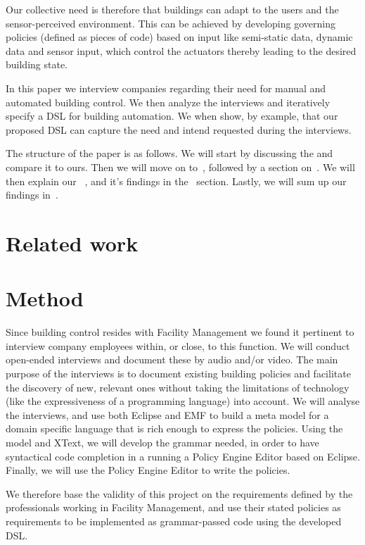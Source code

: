 \documentclass{llncs}
\begin{document}
Our collective need is therefore that buildings can adapt to the users and the sensor-perceived environment. This can be achieved by developing governing policies (defined as pieces of code) based on input like semi-static data, dynamic data and sensor input, which control the actuators thereby leading to the desired building state.

In this paper we interview companies regarding their need for manual and automated building control. We then analyze the interviews and iteratively specify a DSL for building automation. We when show, by example, that our proposed DSL can capture the need and intend requested during the interviews.

The structure of the paper is as follows. We will start by discussing the and compare it to ours. Then we will move on to~, followed by a section on~. We will then explain our~ , and it's findings in the~ section. Lastly, we will sum up our findings in~.

\section{Related work}\label{sec:relatedwork}

\section{Method}\label{sec:method}
Since building control resides with Facility Management we found it pertinent to interview company employees within, or close, to this function. We will conduct open-ended interviews and document these by audio and/or video. The main purpose of the interviews is to document existing building policies and facilitate the discovery of new, relevant ones without taking the limitations of technology (like the expressiveness of a programming language) into account. We will analyse the interviews, and use both Eclipse and EMF to build a meta model for a domain specific language that is rich enough to express the policies. Using the model and XText, we will develop the grammar needed, in order to have syntactical code completion in a running a Policy Engine Editor based on Eclipse. Finally, we will use the Policy Engine Editor to write the policies.

We therefore base the validity of this project on the requirements defined by the professionals working in Facility Management, and use their stated policies as requirements to be implemented as grammar-passed code using the developed DSL.
\end{document}
